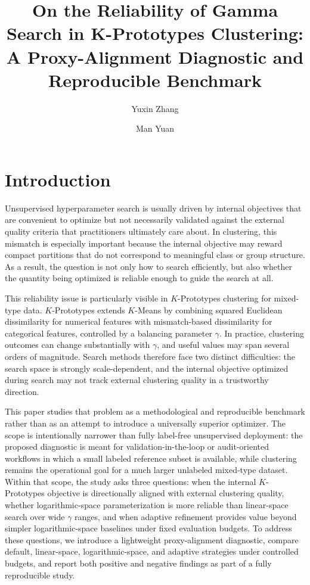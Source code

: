 \documentclass[10pt,lineno]{wlpeerj}
\title{On the Reliability of Gamma Search in K-Prototypes Clustering: A Proxy-Alignment Diagnostic and Reproducible Benchmark}
\author[1]{Yuxin Zhang}
\author[1]{Man Yuan}
\affil[1]{Southwest Jiaotong University Hope College}
\date{}
\begin{document}
\flushbottom
\maketitle
\thispagestyle{empty}

\section*{Introduction}

Unsupervised hyperparameter search is usually driven by internal objectives that are convenient to optimize but not necessarily validated against the external quality criteria that practitioners ultimately care about. In clustering, this mismatch is especially important because the internal objective may reward compact partitions that do not correspond to meaningful class or group structure. As a result, the question is not only how to search efficiently, but also whether the quantity being optimized is reliable enough to guide the search at all.

This reliability issue is particularly visible in $K$-Prototypes clustering for mixed-type data. $K$-Prototypes extends $K$-Means by combining squared Euclidean dissimilarity for numerical features with mismatch-based dissimilarity for categorical features, controlled by a balancing parameter $\gamma$. In practice, clustering outcomes can change substantially with $\gamma$, and useful values may span several orders of magnitude. Search methods therefore face two distinct difficulties: the search space is strongly scale-dependent, and the internal objective optimized during search may not track external clustering quality in a trustworthy direction.

This paper studies that problem as a methodological and reproducible benchmark rather than as an attempt to introduce a universally superior optimizer. The scope is intentionally narrower than fully label-free unsupervised deployment: the proposed diagnostic is meant for validation-in-the-loop or audit-oriented workflows in which a small labeled reference subset is available, while clustering remains the operational goal for a much larger unlabeled mixed-type dataset. Within that scope, the study asks three questions: when the internal $K$-Prototypes objective is directionally aligned with external clustering quality, whether logarithmic-space parameterization is more reliable than linear-space search over wide $\gamma$ ranges, and when adaptive refinement provides value beyond simpler logarithmic-space baselines under fixed evaluation budgets. To address these questions, we introduce a lightweight proxy-alignment diagnostic, compare default, linear-space, logarithmic-space, and adaptive strategies under controlled budgets, and report both positive and negative findings as part of a fully reproducible study.
\end{document}
